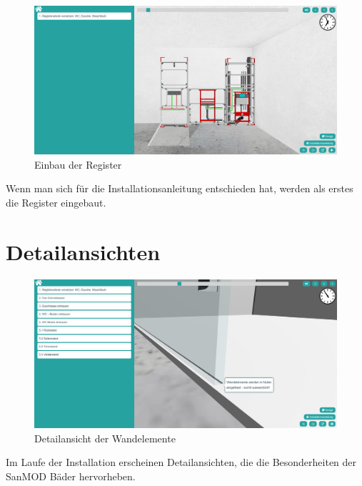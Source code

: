 \begin{figure}[h]
    \centering
    \includegraphics[width=1\linewidth]{images/screenshots/03.png}
    \caption{Einbau der Register}
    \label{}
\end{figure}
\noindent Wenn man sich für die Installationsanleitung entschieden hat, werden als erstes die Register eingebaut.

\clearpage \newpage

\section*{Detailansichten}
\begin{figure}[h]
    \centering
    \includegraphics[width=1\linewidth]{images/screenshots/04.png}
    \caption{Detailansicht der Wandelemente}
    \label{}
\end{figure}
\noindent Im Laufe der Installation erscheinen Detailansichten, die die Besonderheiten der SanMOD Bäder hervorheben. 



